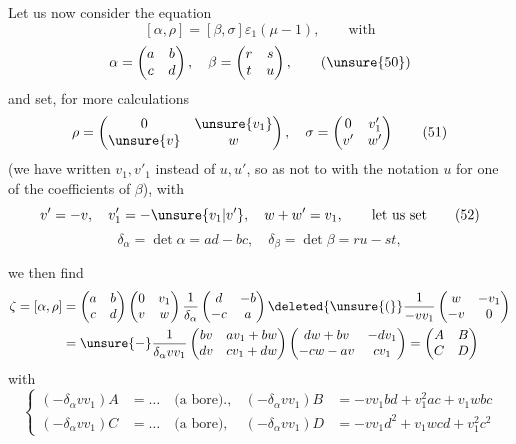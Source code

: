 Let us now consider the equation
\[
[\alpha,\rho]=[\beta,\sigma]\varepsilon_1(\mu-1),\qquad\text{with} \tag{49}
\]
\[
\alpha=\begin{pmatrix}a&b\\c&d\end{pmatrix},\quad
\beta=\begin{pmatrix}r&s\\t&u\end{pmatrix}, \tag{\unsure{50}}
\]
and set, for more  calculations
\[
\rho=\begin{pmatrix}0&\unsure{v_1}\\\unsure{v}&w\end{pmatrix},\quad
\sigma=\begin{pmatrix}0&v'_1\\v'&w'\end{pmatrix} \tag{51}
\]
(we have written $v_1,v'_1$ instead of $u,u'$, so as not to  with the notation $u$ for one of the coefficients of $\beta$), with
\[
v'=-v,\quad v'_1=-\unsure{v_1|v'},\quad w+w'=v_1,\qquad\text{let us set} \tag{52}
\]
\[
\delta_\alpha=\det\alpha=ad-bc,\quad
\delta_\beta=\det\beta=ru-st,
\tag{53}
\]


we then find
\[
\begin{aligned}
\zeta=[\alpha,\rho]
&=\begin{pmatrix}a&b\\c&d\end{pmatrix}
\begin{pmatrix}0&v_1\\v&w\end{pmatrix}
\frac1{\delta_\alpha}\begin{pmatrix}d&-b\\-c&a\end{pmatrix}
\deleted{\unsure{(}}\frac1{-vv_1}\begin{pmatrix}w&-v_1\\-v&0\end{pmatrix}\\
&=\unsure{-}\frac1{\delta_\alpha vv_1}
\begin{pmatrix}bv&av_1+bw\\dv&cv_1+dw\end{pmatrix}
\begin{pmatrix}dw+bv&-dv_1\\-cw-av&cv_1\end{pmatrix}
=\begin{pmatrix}A&B\\C&D\end{pmatrix}
\end{aligned}
\]
with
\[
\left\{\begin{aligned}
(-\delta_\alpha vv_1)A&=\ldots\quad\text{(a bore).},
&(-\delta_\alpha vv_1)B&=-vv_1bd+v_1^2ac+v_1wbc\\
(-\delta_\alpha vv_1)C&=\ldots\quad\text{(a bore)},
&(-\delta_\alpha vv_1)D&=-vv_1d^2+v_1wcd+v_1^2c^2
\end{aligned}\right. \tag{54}
\]

